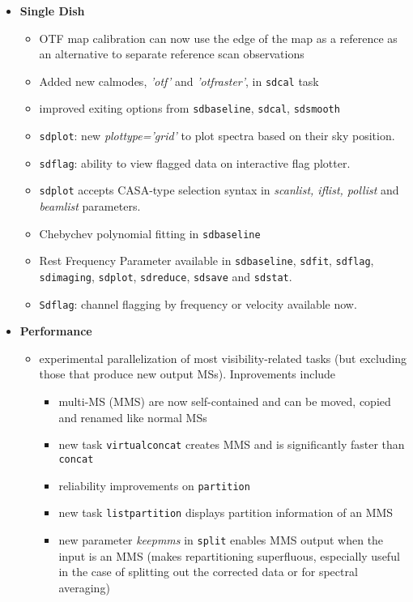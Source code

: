 \begin{itemize}
\begin{itemize}
\end{itemize}

\item {\bf Single Dish}
\begin{itemize}
   \item  OTF map calibration can now use the edge of the map as a reference as an alternative to separate reference scan observations
   \item   Added new calmodes, {\it 'otf'} and {\it 'otfraster'}, in {\tt sdcal} task
   \item  improved exiting options from {\tt sdbaseline}, {\tt sdcal}, {\tt sdsmooth}
   \item  {\tt sdplot}: new {\it plottype='grid'} to plot spectra based on their sky position.
   \item  {\tt sdflag}: ability to view flagged data on interactive flag plotter.
   \item  {\tt sdplot} accepts CASA-type selection syntax in {\it scanlist, iflist, pollist} and {\it beamlist} parameters.
   \item  Chebychev polynomial fitting in {\tt sdbaseline}
   \item  Rest Frequency Parameter available in {\tt sdbaseline}, {\tt sdfit}, {\tt sdflag}, {\tt sdimaging}, {\tt sdplot}, {\tt sdreduce}, {\tt sdsave} and {\tt sdstat}.
    \item  {\tt Sdflag}: channel flagging by frequency or velocity available now.
   
\end{itemize}


\item {\bf Performance}
 
\begin{itemize}
    \item  experimental parallelization of most visibility-related tasks (but excluding those that produce new output MSs). Inprovements include
      \begin{itemize}
    \item  multi-MS (MMS) are now self-contained and can be moved, copied and renamed like normal MSs
    \item  new task {\tt virtualconcat} creates MMS and is significantly faster than {\tt concat}
    \item  reliability improvements on {\tt partition}
    \item  new task {\tt listpartition} displays partition information of an MMS
    \item  new parameter {\it keepmms} in {\tt split} enables MMS output
     when the input is an MMS (makes repartitioning superfluous, especially
     useful in the case of splitting out the corrected data or for spectral averaging)


\end{itemize}
\end{itemize}
\end{itemize}
